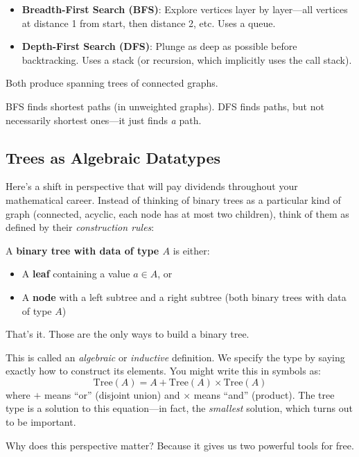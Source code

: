 \begin{definition}
\begin{itemize}
  \item \textbf{Breadth-First Search (BFS)}: Explore vertices layer by layer---all vertices at distance 1 from start, then distance 2, etc. Uses a queue.
  \item \textbf{Depth-First Search (DFS)}: Plunge as deep as possible before backtracking. Uses a stack (or recursion, which implicitly uses the call stack).
\end{itemize}
Both produce spanning trees of connected graphs.
\end{definition}

BFS finds shortest paths (in unweighted graphs). DFS finds paths, but not necessarily shortest ones---it just finds \emph{a} path.

\subsection*{Trees as Algebraic Datatypes}

Here's a shift in perspective that will pay dividends throughout your mathematical career. Instead of thinking of binary trees as a particular kind of graph (connected, acyclic, each node has at most two children), think of them as defined by their \emph{construction rules}:

\begin{definition}
A \textbf{binary tree with data of type $A$} is either:
\begin{itemize}
  \item A \textbf{leaf} containing a value $a \in A$, or
  \item A \textbf{node} with a left subtree and a right subtree (both binary trees with data of type $A$)
\end{itemize}
That's it. Those are the only ways to build a binary tree.
\end{definition}

This is called an \emph{algebraic} or \emph{inductive} definition. We specify the type by saying exactly how to construct its elements. You might write this in symbols as:
\[
\text{Tree}(A) = A + \text{Tree}(A) \times \text{Tree}(A)
\]
where $+$ means ``or'' (disjoint union) and $\times$ means ``and'' (product). The tree type is a solution to this equation---in fact, the \emph{smallest} solution, which turns out to be important.

Why does this perspective matter? Because it gives us two powerful tools for free.


